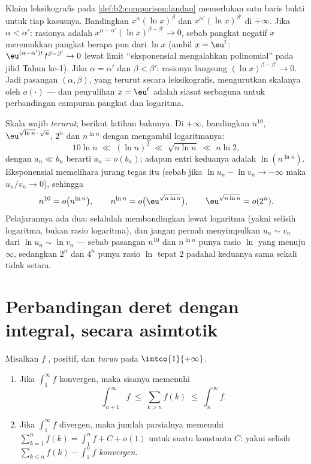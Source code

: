 \begin{example}\label{ex:b2:comparison:scaleorder}
Klaim leksikografis pada \cref{def:b2:comparison:landau}
memerlukan satu baris bukti untuk tiap kasusnya. Bandingkan
$x^{\alpha}(\ln x)^{\beta}$ dan $x^{\alpha'}(\ln x)^{\beta'}$
di $+\infty$. Jika $\alpha < \alpha'$: rasionya adalah
$x^{\alpha - \alpha'}(\ln x)^{\beta - \beta'} \to 0$, sebab
pangkat negatif $x$ meremukkan pangkat berapa pun dari $\ln x$ (ambil $x =
\eu^t$: $\eu^{(\alpha - \alpha')t}\,t^{\beta - \beta'} \to 0$
lewat limit ``eksponensial mengalahkan polinomial'' pada jilid Tahun
ke-1). Jika $\alpha = \alpha'$ dan $\beta < \beta'$: rasionya
langsung $(\ln x)^{\beta - \beta'} \to 0$. Jadi pasangan
$(\alpha, \beta)$, yang terurut secara leksikografis, mengurutkan
skalanya oleh $o(\cdot)$ --- dan penyulihan $x = \eu^t$ adalah
siasat serbaguna untuk perbandingan campuran pangkat dan logaritma.
\end{example}

\begin{example}\label{ex:b2:comparison:ranking}
Skala wajib \emph{terurut}; berikut latihan bakunya. Di
$+\infty$, bandingkan $n^{10}$, $\eu^{\sqrt{\ln n}\,\cdot\,\sqrt n}$,
$2^n$ dan $n^{\ln n}$ dengan mengambil logaritmanya:
\[
10\ln n
\;\ll\; (\ln n)^2
\;\ll\; \sqrt{n\ln n}
\;\ll\; n\ln 2 ,
\]
dengan $a_n \ll b_n$ berarti $a_n = o(b_n)$; adapun entri keduanya
adalah $\ln(n^{\ln n})$. Eksponensial memelihara jurang tegas itu (sebab
jika $\ln u_n - \ln v_n \to -\infty$ maka $u_n/v_n \to 0$), sehingga
\[
n^{10} = o\bigl(n^{\ln n}\bigr),
\qquad
n^{\ln n} = o\bigl(\eu^{\sqrt{n\ln n}}\bigr),
\qquad
\eu^{\sqrt{n\ln n}} = o(2^n) .
\]
Pelajarannya ada dua: selalulah membandingkan lewat logaritma
(yakni selisih logaritma, bukan rasio logaritma), dan jangan pernah
menyimpulkan $u_n \sim v_n$ dari $\ln u_n \sim \ln v_n$ --- sebab pasangan
$n^{10}$ dan $n^{\ln n}$ punya rasio $\ln$ yang menuju $\infty$, sedangkan
$2^n$ dan $4^n$ punya rasio $\ln$ tepat $2$ padahal keduanya sama sekali
tidak setara.
\end{example}

\section{Perbandingan deret dengan integral, secara asimtotik}

\begin{theorem}\label{thm:b2:comparison:seriesintegral}
Misalkan $f$ , positif, dan \emph{turun} pada
$\intco{1}{+\infty}$.
\begin{enumerate}
  \item Jika $\int_1^{\infty} f$ konvergen, maka sisanya memenuhi
        \[
        \int_{n+1}^{\infty} f \;\leq\; \sum_{k > n} f(k) \;\leq\;
        \int_{n}^{\infty} f .
        \]
  \item Jika $\int_1^\infty f$ divergen, maka jumlah parsialnya memenuhi
        $\sum_{k=1}^{n} f(k) = \int_1^n f + C + o(1)$ untuk suatu
        konstanta $C$: yakni selisih $\sum_{k \leq n} f(k) -
        \int_1^n f$ \emph{konvergen}.
\end{enumerate}
\end{theorem}

